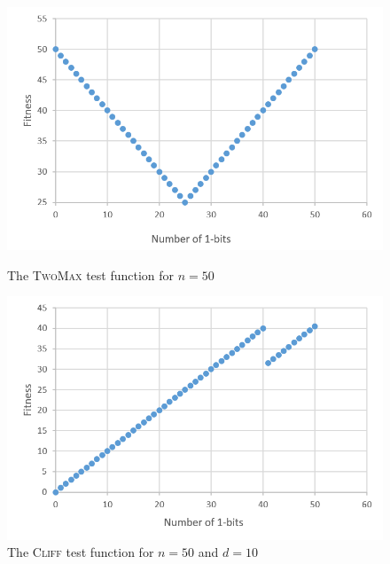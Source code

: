 \documentclass[lettersize,journal]{IEEEtran}
\begin{document}
\begin{figure}
\begin{minipage}{.5\textwidth}
\centering
\includegraphics[width=1\textwidth]{4}
\caption{The \textsc{TwoMax} test function for $n=50$}
\label{fig:twomax}
\end{minipage}
\begin{minipage}{.5\textwidth}
\centering
\includegraphics[width=1\textwidth]{2}
\caption{The \textsc{Cliff} test function for $n=50$ and $d=10$}
\label{fig:cliff}
\end{minipage}%
\end{figure}







% 
\end{document}
